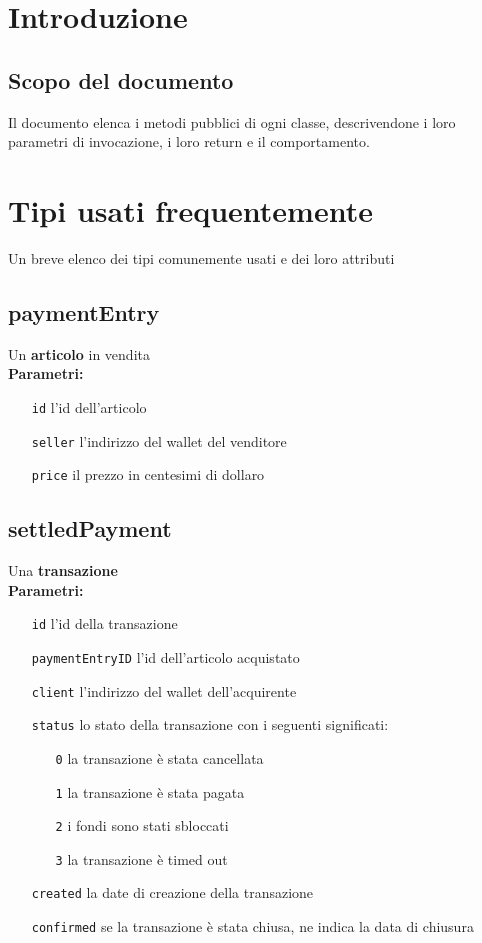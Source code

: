 \documentclass[a4paper, 12pt]{article}
\begin{document}
\makefrontpage

\makeversioni

\section{Introduzione}
\subsection{Scopo del documento}
Il documento elenca i metodi pubblici di ogni classe, descrivendone i loro parametri di invocazione, i loro return e il comportamento.

\section{Tipi usati frequentemente}\label{tipi}
Un breve elenco dei tipi comunemente usati e dei loro attributi

\subsection{paymentEntry}
Un \textbf{articolo} in vendita\\
\textbf{Parametri:}
\begin{itemize}
\item[\texttt{id}]	l'id dell'articolo
\item[\texttt{seller}] l'indirizzo del wallet del venditore
\item[\texttt{price}] il prezzo in centesimi di dollaro
\end{itemize}

\subsection{settledPayment}
Una \textbf{transazione}\\
\textbf{Parametri:}
\begin{itemize}
\item[\texttt{id}]	l'id della transazione
\item[\texttt{paymentEntryID}]	l'id dell'articolo acquistato
\item[\texttt{client}] l'indirizzo del wallet dell'acquirente
\item[\texttt{status}] lo stato della transazione con i seguenti significati:
	\begin{itemize}
	\item[\texttt{0}] la transazione è stata cancellata
	\item[\texttt{1}] la transazione è stata pagata
	\item[\texttt{2}] i fondi sono stati sbloccati
	\item[\texttt{3}] la transazione è timed out
	\end{itemize}
\item[\texttt{created}] la date di creazione della transazione
\item[\texttt{confirmed}] se la transazione è stata chiusa, ne indica la data di chiusura
\end{itemize}
\end{document}
